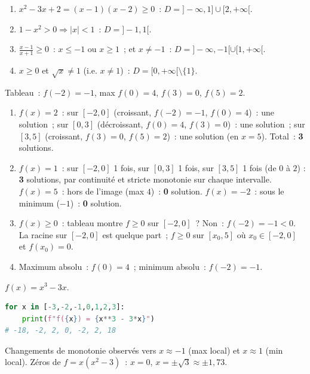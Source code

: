 \begin{enumerate}
  \item $x^2-3x+2=(x-1)(x-2)\geq0$~: $D=]-\infty,1]\cup[2,+\infty[$.
  \item $1-x^2>0\Rightarrow|x|<1$~: $D=]-1,1[$.
  \item $\frac{x-1}{x+1}\geq0$~: $x\leq-1$ ou $x\geq1$~; et $x\ne-1$~:
        $D=]-\infty,-1[\cup[1,+\infty[$.
  \item $x\geq0$ et $\sqrt{x}\ne1$ (i.e. $x\ne1$)~: $D=[0,+\infty[\setminus\{1\}$.
\end{enumerate}


Tableau~: $f(-2)=-1$, max $f(0)=4$, $f(3)=0$, $f(5)=2$.
\begin{enumerate}
  \item $f(x)=2$~: sur $[-2,0]$ (croissant, $f(-2)=-1$, $f(0)=4$)~: une solution~;
        sur $[0,3]$ (d\'ecroissant, $f(0)=4$, $f(3)=0$)~: une solution~;
        sur $[3,5]$ (croissant, $f(3)=0$, $f(5)=2$)~: une solution (en $x=5$).
        Total~: \textbf{3} solutions.
  \item $f(x)=1$~: sur $[-2,0]$ 1 fois, sur $[0,3]$ 1 fois, sur $[3,5]$ 1 fois (de $0$ \`a $2$) :
        \textbf{3} solutions, par continuit\'e et stricte monotonie sur chaque intervalle.
        $f(x)=5$~: hors de l'image (max $4$)~: \textbf{0} solution.
        $f(x)=-2$~: sous le minimum ($-1$)~: \textbf{0} solution.
  \item $f(x)\geq0$~: tableau montre $f\geq0$ sur $[-2,0]$~? Non~: $f(-2)=-1<0$.
        La racine sur $[-2,0]$ est quelque part~; $f\geq0$ sur $[x_0,5]$ o\`u $x_0\in[-2,0]$ et $f(x_0)=0$.
  \item Maximum absolu~: $f(0)=4$~; minimum absolu~: $f(-2)=-1$.
\end{enumerate}


$f(x)=x^3-3x$.
\begin{lstlisting}[language=Python]
for x in [-3,-2,-1,0,1,2,3]:
    print(f"f({x}) = {x**3 - 3*x}")
# -18, -2, 2, 0, -2, 2, 18
\end{lstlisting}
Changements de monotonie observ\'es vers $x\approx-1$ (max local) et $x\approx1$ (min local).
Z\'eros de $f=x(x^2-3)$~: $x=0$, $x=\pm\sqrt{3}\approx\pm1{,}73$.


